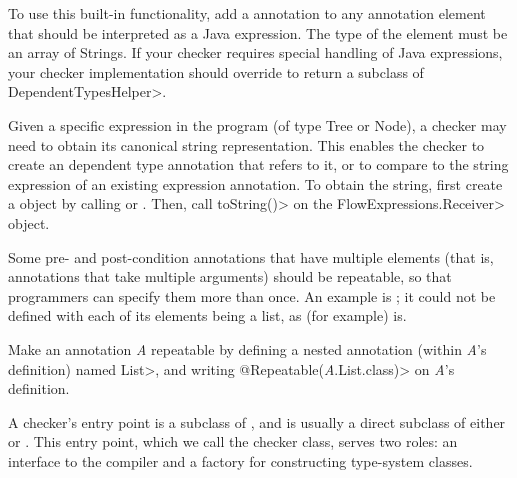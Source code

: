 To use this built-in functionality, add a  annotation
to any annotation element that should be interpreted as a Java expression.  The type of the
element must be an array of Strings.  If your checker requires special handling of Java expressions,
your checker implementation should override
to return a subclass of \<DependentTypesHelper>.

Given a specific expression in the program (of type Tree or Node), a
checker may need to obtain its canonical string representation.  This
enables the checker to create an dependent type annotation that refers to
it, or to compare to the string expression of an existing expression
annotation.
To obtain the string, first create a
 object by calling
 or
.
Then, call \<toString()> on the \<FlowExpressions.Receiver> object.



Some pre- and post-condition annotations that have multiple elements (that
is, annotations that take multiple arguments) should be repeatable, so that
programmers can specify them more than once.  An example is
; it could not be
defined with each of its elements being a list, as (for example)
 is.

Make an annotation \emph{A} repeatable by defining a nested annotation (within
\emph{A}'s definition) named \<List>, and writing
\<@Repeatable(\emph{A}.List.class)> on \emph{A}'s definition.



A checker's entry point is a subclass of
, and is usually a direct subclass
of either  or
.
This entry
point, which we call the checker class, serves two
roles:  an interface to the compiler and a factory for constructing
type-system classes.

